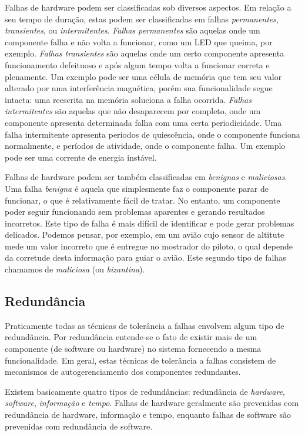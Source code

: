 Falhas de hardware podem ser classificadas sob diversos aspectos. Em relação a seu tempo de duração, estas podem ser classificadas em falhas \emph{permanentes}, \emph{transientes}, ou \emph{intermitentes}. \emph{Falhas permanentes} são aquelas onde um componente falha e não volta a funcionar, como um LED que queima, por exemplo. \emph{Falhas transientes} são aquelas onde um certo componente apresenta funcionamento defeituoso e após algum tempo volta a funcionar correta e plenamente. Um exemplo pode ser uma célula de memória que tem seu valor alterado por uma interferência magnética, porém sua funcionalidade segue intacta: uma reescrita na memória soluciona a falha ocorrida. \emph{Falhas intermitentes} são aquelas que não desaparecem por completo, onde um componente apresenta determinada falha com uma certa periodicidade. Uma falha intermitente apresenta períodos de quiescência, onde o componente funciona normalmente, e períodos de atividade, onde o componente falha. Um exemplo pode ser uma corrente de energia instável.

Falhas de hardware podem ser também classificadas em \emph{benignas} e \emph{maliciosas}. Uma falha \emph{benigna} é aquela que simplesmente faz o componente parar de funcionar, o que é relativamente fácil de tratar. No entanto, um componente poder seguir funcionando sem problemas aparentes e gerando resultados incorretos. Este tipo de falha é mais difícil de identificar e pode gerar problemas delicados. Podemos pensar, por exemplo, em um avião cujo sensor de altitute mede um valor incorreto que é entregue no mostrador do piloto, o qual depende da corretude desta informação para guiar o avião. Este segundo tipo de falhas chamamos de \emph{maliciosa} (ou \emph{bizantina}).

\subsection{Redundância} %
\label{sub:redundancia}

Praticamente todas as técnicas de tolerância a falhas envolvem algum tipo de redundância. Por redundância entende-se o fato de existir mais de um componente (de software ou hardware) no sistema fornecendo a mesma funcionalidade. Em geral, estas técnicas de tolerância a falhas consistem de mecanismos de autogerenciamento dos componentes redundantes.

Existem basicamente quatro tipos de redundâncias: redundância de \emph{hardware}, \emph{software}, \emph{informação} e \emph{tempo}. Falhas de hardware geralmente são prevenidas com redundância de hardware, informação e tempo, enquanto falhas de software são prevenidas com redundância de software.

